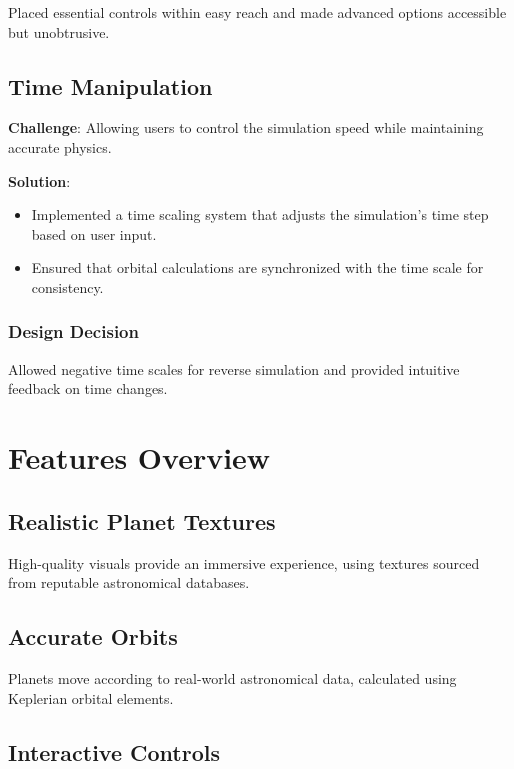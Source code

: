 \documentclass[12pt, a4paper]{article}
\begin{document}
Placed essential controls within easy reach and made advanced options
accessible but unobtrusive.

\subsection{Time Manipulation}

\textbf{Challenge}: Allowing users to control the simulation speed while maintaining accurate physics.

\textbf{Solution}:

\begin{itemize}
    \item Implemented a time scaling system that adjusts the simulation's time step based
          on user input.
    \item Ensured that orbital calculations are synchronized with the time scale for
          consistency.
\end{itemize}

\subsubsection{Design Decision}

Allowed negative time scales for reverse simulation and provided intuitive
feedback on time changes.

\section{Features Overview}

\subsection{Realistic Planet Textures}

High-quality visuals provide an immersive experience, using textures sourced
from reputable astronomical databases.

\subsection{Accurate Orbits}

Planets move according to real-world astronomical data, calculated using
Keplerian orbital elements.

\subsection{Interactive Controls}
\end{document}
